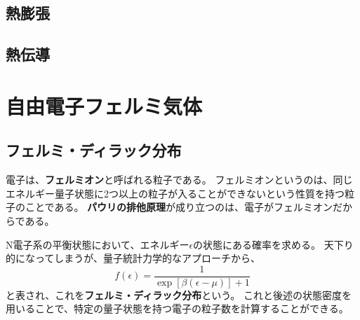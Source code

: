 \documentclass[a4paper]{jsreport}
\begin{document}
        \section{熱膨張}
        \section{熱伝導}
        
    \chapter{自由電子フェルミ気体}
        \section{フェルミ・ディラック分布}
            電子は、\textbf{フェルミオン}と呼ばれる粒子である。
            フェルミオンというのは、同じエネルギー量子状態に2つ以上の粒子が入ることができないという性質を持つ粒子のことである。
            \textbf{パウリの排他原理}が成り立つのは、電子がフェルミオンだからである。\par
             N電子系の平衡状態において、エネルギー$\epsilon$の状態にある確率を求める。
             天下り的になってしまうが、量子統計力学的なアプローチから、
             \begin{equation}
                f(\epsilon) = \frac{1}{\exp[\beta(\epsilon - \mu)] + 1}
             \end{equation}
             と表され、これを\textbf{フェルミ・ディラック分布}という。
             これと後述の状態密度を用いることで、特定の量子状態を持つ電子の粒子数を計算することができる。
\end{document}
